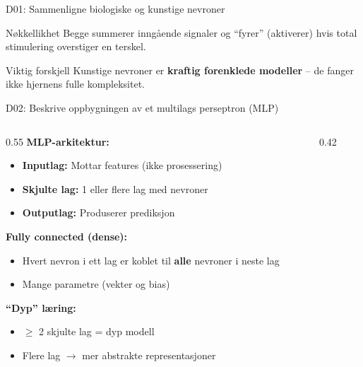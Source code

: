 \documentclass[aspectratio=169, 10pt]{beamer}
\begin{document}
\begin{frame}{D01: Sammenligne biologiske og kunstige nevroner}
    \vspace{0.5cm}
    \begin{block}{Nøkkellikhet}
        Begge summerer inngående signaler og ``fyrer'' (aktiverer) hvis total stimulering overstiger en terskel.
    \end{block}
    
    \begin{alertblock}{Viktig forskjell}
        Kunstige nevroner er \textbf{kraftig forenklede modeller} -- de fanger ikke hjernens fulle kompleksitet.
    \end{alertblock}
\end{frame}

\begin{frame}{D02: Beskrive oppbygningen av et multilags perseptron (MLP)}
    \begin{columns}[T]
        \begin{column}{0.55\textwidth}
            \textbf{MLP-arkitektur:}
            \begin{itemize}
                \item \textbf{Inputlag:} Mottar features (ikke prosessering)
                \item \textbf{Skjulte lag:} 1 eller flere lag med nevroner
                \item \textbf{Outputlag:} Produserer prediksjon
            \end{itemize}
            
            \vspace{0.3cm}
            \textbf{Fully connected (dense):}
            \begin{itemize}
                \item Hvert nevron i ett lag er koblet til \textbf{alle} nevroner i neste lag
                \item Mange parametre (vekter og bias)
            \end{itemize}
            
            \vspace{0.3cm}
            \textbf{``Dyp'' læring:}
            \begin{itemize}
                \item $\geq$ 2 skjulte lag = dyp modell
                \item Flere lag $\rightarrow$ mer abstrakte representasjoner
            \end{itemize}
        \end{column}
        \begin{column}{0.42\textwidth}
\end{column}
\end{columns}
\end{frame}
\end{document}
